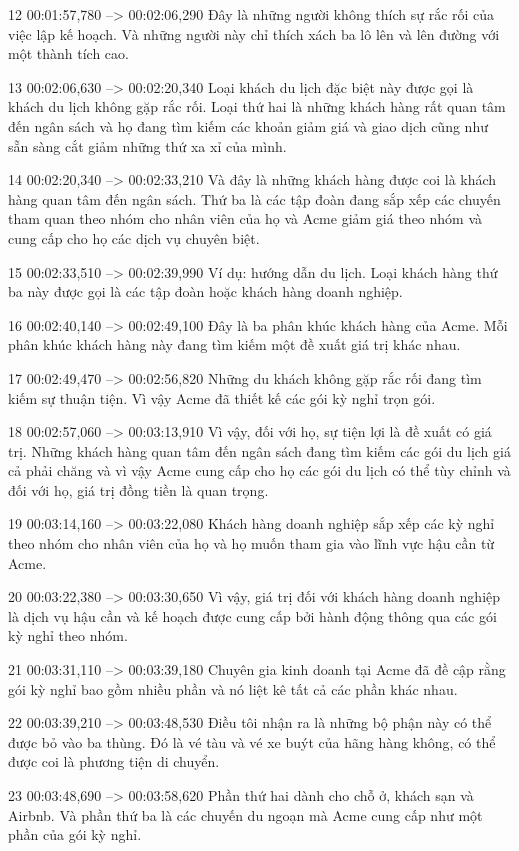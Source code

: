 12
00:01:57,780 --> 00:02:06,290
Đây là những người không thích sự rắc rối của việc lập kế hoạch.  Và những người này chỉ thích xách ba lô lên và lên đường với một thành tích cao.

13
00:02:06,630 --> 00:02:20,340
Loại khách du lịch đặc biệt này được gọi là khách du lịch không gặp rắc rối.  Loại thứ hai là những khách hàng rất quan tâm đến ngân sách và họ đang tìm kiếm các khoản giảm giá và giao dịch cũng như sẵn sàng cắt giảm những thứ xa xỉ của mình.

14
00:02:20,340 --> 00:02:33,210
Và đây là những khách hàng được coi là khách hàng quan tâm đến ngân sách.  Thứ ba là các tập đoàn đang sắp xếp các chuyến tham quan theo nhóm cho nhân viên của họ và Acme giảm giá theo nhóm và cung cấp cho họ các dịch vụ chuyên biệt.

15
00:02:33,510 --> 00:02:39,990
Ví dụ: hướng dẫn du lịch.  Loại khách hàng thứ ba này được gọi là các tập đoàn hoặc khách hàng doanh nghiệp.

16
00:02:40,140 --> 00:02:49,100
Đây là ba phân khúc khách hàng của Acme.  Mỗi phân khúc khách hàng này đang tìm kiếm một đề xuất giá trị khác nhau.

17
00:02:49,470 --> 00:02:56,820
Những du khách không gặp rắc rối đang tìm kiếm sự thuận tiện.  Vì vậy Acme đã thiết kế các gói kỳ nghỉ trọn gói.

18
00:02:57,060 --> 00:03:13,910
Vì vậy, đối với họ, sự tiện lợi là đề xuất có giá trị.  Những khách hàng quan tâm đến ngân sách đang tìm kiếm các gói du lịch giá cả phải chăng và vì vậy Acme cung cấp cho họ các gói du lịch có thể tùy chỉnh và đối với họ, giá trị đồng tiền là quan trọng.

19
00:03:14,160 --> 00:03:22,080
Khách hàng doanh nghiệp sắp xếp các kỳ nghỉ theo nhóm cho nhân viên của họ và họ muốn tham gia vào lĩnh vực hậu cần từ Acme.

20
00:03:22,380 --> 00:03:30,650
Vì vậy, giá trị đối với khách hàng doanh nghiệp là dịch vụ hậu cần và kế hoạch được cung cấp bởi hành động thông qua các gói kỳ nghỉ theo nhóm.

21
00:03:31,110 --> 00:03:39,180
Chuyên gia kinh doanh tại Acme đã đề cập rằng gói kỳ nghỉ bao gồm nhiều phần và nó liệt kê tất cả các phần khác nhau.

22
00:03:39,210 --> 00:03:48,530
Điều tôi nhận ra là những bộ phận này có thể được bỏ vào ba thùng.  Đó là vé tàu và vé xe buýt của hãng hàng không, có thể được coi là phương tiện di chuyển.

23
00:03:48,690 --> 00:03:58,620
Phần thứ hai dành cho chỗ ở, khách sạn và Airbnb.  Và phần thứ ba là các chuyến du ngoạn mà Acme cung cấp như một phần của gói kỳ nghỉ.

